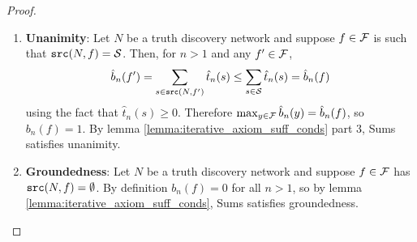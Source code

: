 \documentclass[../main.tex]{subfiles}
\begin{document}
\begin{proof}
\begin{enumerate}
\item\textbf{Unanimity}: Let $N$ be a truth discovery network and suppose $f \in \mathcal{F}$
is such that $\texttt{src}(N, f) = \mathcal{S}$. Then, for $n > 1$ and any $f' \in \mathcal{F}$,
\[
    \hat{b}_n(f') = \sum_{s \in \texttt{src}(N, f')}{\hat{t}_n(s)}
                  \le \sum_{s \in \mathcal{S}}{\hat{t}_n(s)}
                  = \hat{b}_n(f)
\]
using the fact that $\hat{t}_n(s) \ge 0$. Therefore $\max_{y \in
\mathcal{F}}{\hat{b}_n(y)} = \hat{b}_n(f)$, so $b_n(f) = 1$. By lemma
\ref{lemma:iterative_axiom_suff_conds} part 3, Sums satisfies unanimity.

\item\textbf{Groundedness}: Let $N$ be a truth discovery network and suppose $f
\in \mathcal{F}$ has $\texttt{src}(N, f) = \emptyset$. By definition $b_n(f) = 0$ for all $n >
1$, so by lemma \ref{lemma:iterative_axiom_suff_conds}, Sums satisfies
groundedness.


\end{enumerate}
\end{proof}
\end{document}
